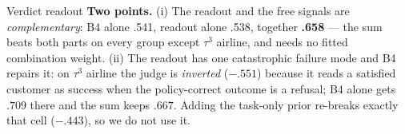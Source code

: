 \documentclass[10pt, aspectratio=43]{beamer}
\begin{document}
\begin{frame}{Verdict readout}
\textbf{Two points.} (i) The readout and the free signals are \emph{complementary}: B4 alone .541, readout alone
.538, together \textbf{.658} --- the sum beats both parts on every group except $\tau^3$ airline, and needs no
fitted combination weight. (ii) The readout has one catastrophic failure mode and B4 repairs it: on
$\tau^3$ airline the judge is \emph{inverted} ($-.551$) because it reads a satisfied customer as success when
the policy-correct outcome is a refusal; B4 alone gets $.709$ there and the sum keeps $.667$. Adding the
task-only prior re-breaks exactly that cell ($-.443$), so we do not use it.
\end{frame}
\end{document}
